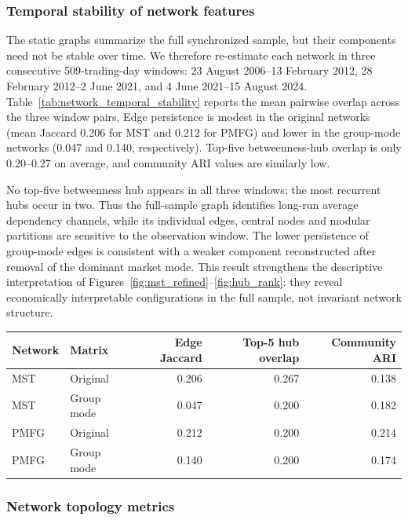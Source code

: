 \subsubsection{Temporal stability of network features}

The static graphs summarize the full synchronized sample, but their components need not be stable over time. We therefore re-estimate each network in three consecutive 509-trading-day windows: 23 August 2006--13 February 2012, 28 February 2012--2 June 2021, and 4 June 2021--15 August 2024. Table~\ref{tab:network_temporal_stability} reports the mean pairwise overlap across the three window pairs. Edge persistence is modest in the original networks (mean Jaccard 0.206 for MST and 0.212 for PMFG) and lower in the group-mode networks (0.047 and 0.140, respectively). Top-five betweenness-hub overlap is only 0.20--0.27 on average, and community ARI values are similarly low.

No top-five betweenness hub appears in all three windows; the most recurrent hubs occur in two. Thus the full-sample graph identifies long-run average dependency channels, while its individual edges, central nodes and modular partitions are sensitive to the observation window. The lower persistence of group-mode edges is consistent with a weaker component reconstructed after removal of the dominant market mode. This result strengthens the descriptive interpretation of Figures~\ref{fig:mst_refined}--\ref{fig:hub_rank}: they reveal economically interpretable configurations in the full sample, not invariant network structure.

\begin{center}
\label{tab:network_temporal_stability}
\begin{tabular}{llrrr}
\toprule
Network & Matrix & Edge Jaccard & Top-5 hub overlap & Community ARI \\
\midrule
MST & Original & 0.206 & 0.267 & 0.138 \\
MST & Group mode & 0.047 & 0.200 & 0.182 \\
PMFG & Original & 0.212 & 0.200 & 0.214 \\
PMFG & Group mode & 0.140 & 0.200 & 0.174 \\
\bottomrule
\end{tabular}
\end{center}


\subsubsection{Network topology metrics}

